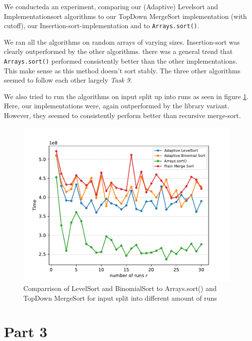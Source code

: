 \documentclass[11pt, a4paper]{article}
\begin{document}
We conducteda an experiment, comparing our (Adaptive) Levelsort and Implementationsort algorithms to our TopDown MergeSort implementation (with cutoff), our Insertion-sort-implementation and to \verb|Arrays.sort()|. 

We ran all the algorithms on random arrays of varying sizes.  Insertion-sort was clearly outperformed by the other algorithms. there was a general trend that \verb|Arrays.sort()| performed consistently better than the other implementations. This make sense as this method doesn't sort stably. The three other algorithms seemed to follow each other largely \textit{Task 9}.

We also tried to run the algorithms on input split up into runs as seen in figure \ref{fig:adaptComp}. Here, our implementations were, again outperformed by the library variant. However, they seemed to consistently perform better than recursive merge-sort. 

\begin{figure}[h]
  \begin{center}
    \includegraphics[width=\textwidth]{plot/t10runs_time_plot.pdf}
    \caption{Comparrison of LevelSort and BinomialSort to Arrays.sort() and TopDown MergeSort for input split into different amount of runs}
    \label{fig:adaptComp}
  \end{center}
\end{figure}




\section{Part 3}
\end{document}
